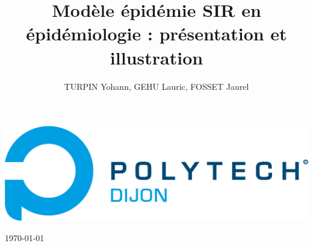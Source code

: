 \documentclass[11pt]{report}
\title{Modèle épidémie SIR en épidémiologie : présentation et illustration}
\author{TURPIN Yohann, GEHU Lauric, FOSSET Jaurel}
\begin{document}
    \cfoot{\thepage}
    
    \makeatletter
    \begin{titlepage}
        \reversemarginpar\marginpar
        {
            \vspace{-86pt}
            \hspace*{25pt}
            \includegraphics{logo_esirem.png}
        }
        
        {\centering
            \vspace{3cm}
            \par\vspace{5cm}
            {\scshape\huge\textbf{\hspace{2cm}\@title}} \par\vspace{6cm}
            
            {\LARGE
            \begin{flushright}
                    \item \@author
                    \item \today
            \end{flushright}
            }
        }
    \end{titlepage}
    \makeatother


    \null
    \thispagestyle{empty}
    \addtocounter{page}{-1}
    \newpage

    
    \tableofcontents
    \newpage

    \setlength{\abovedisplayskip}{6pt}
    \setlength{\belowdisplayskip}{6pt}


    
    
    
    
    
    
\end{document}
